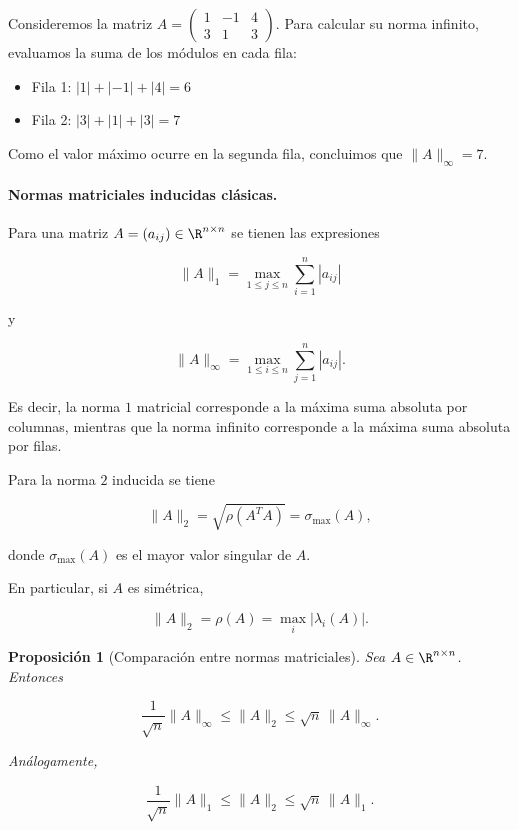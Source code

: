 \documentclass[12pt]{article}
\newtheorem{proposicion}{Proposición}
\begin{document}
\begin{ejemplo}
Consideremos la matriz $A = \begin{pmatrix} 1 & -1 & 4 \\ 3 & 1 & 3 \end{pmatrix}$. Para calcular su norma infinito, evaluamos la suma de los módulos en cada fila:
\begin{itemize}
    \item Fila 1: $|1| + |-1| + |4| = 6$
    \item Fila 2: $|3| + |1| + |3| = 7$
\end{itemize}
Como el valor máximo ocurre en la segunda fila, concluimos que $\|A\|_\infty = 7$.
\end{ejemplo}

\paragraph{Normas matriciales inducidas clásicas.}

Para una matriz $A=(a_{ij})\in\R^{n\times n}$ se tienen las expresiones

\[
    \boxed{
    \|A\|_1
    =
    \max_{1\le j\le n}
    \sum_{i=1}^n |a_{ij}|
    }
\]

y

\[
    \boxed{
    \|A\|_\infty
    =
    \max_{1\le i\le n}
    \sum_{j=1}^n |a_{ij}|
    }.
\]

Es decir, la norma $1$ matricial corresponde a la máxima suma
absoluta por columnas, mientras que la norma infinito corresponde
a la máxima suma absoluta por filas.

Para la norma $2$ inducida se tiene

\[
    \boxed{
    \|A\|_2
    =
    \sqrt{\rho(A^TA)}
    =
    \sigma_{\max}(A),
    }
\]

donde $\sigma_{\max}(A)$ es el mayor valor singular de $A$.

En particular, si $A$ es simétrica,

\[
    \|A\|_2
    =
    \rho(A)
    =
    \max_i |\lambda_i(A)|.
\]

\begin{proposicion}[Comparación entre normas matriciales]
Sea $A\in\R^{n\times n}$. Entonces

\[
    \frac{1}{\sqrt n}\|A\|_\infty
    \leq
    \|A\|_2
    \leq
    \sqrt n\,\|A\|_\infty.
\]

Análogamente,

\[
    \frac{1}{\sqrt n}\|A\|_1
    \leq
    \|A\|_2
    \leq
    \sqrt n\,\|A\|_1.
\]
\end{proposicion}
\end{document}
